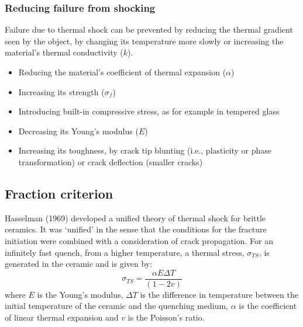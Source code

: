 \subsubsection{Reducing failure from shocking}
Failure due to thermal shock can be prevented by reducing the thermal gradient seen by the object, by changing its temperature more slowly or increasing the material's thermal conductivity ($k$).
\begin{itemize}
    \item Reducing the material's coefficient of thermal expansion ($\alpha$)
    \item Increasing its strength ($\sigma_f$)
    \item Introducing built-in compressive stress, as for example in tempered glass
    \item Decreasing its Young's modulus ($E$)
    \item Increasing its toughness, by crack tip blunting (i.e., plasticity or phase transformation) or crack deflection (smaller cracks)
\end{itemize}
\subsection{Fraction criterion}
Hasselman (1969) developed a unified theory of thermal shock for brittle ceramics. It was `unified' in the sense that the conditions for the fracture initiation were combined with a consideration of crack propagation. For an infinitely fast quench, from a higher temperature, a thermal stress, $\sigma_{TS}$, is generated in the ceramic and is given by:
\begin{equation}
    \sigma_{TS} = \frac{\alpha E \Delta T}{\left(1-2v\right)}
\end{equation}
where $E$ is the Young's modulus, $\Delta T$ is the difference in temperature between the initial temperature of the ceramic and the quenching medium, $\alpha$ is the coefficient of linear thermal expansion and $v$ is the Poisson's ratio.

